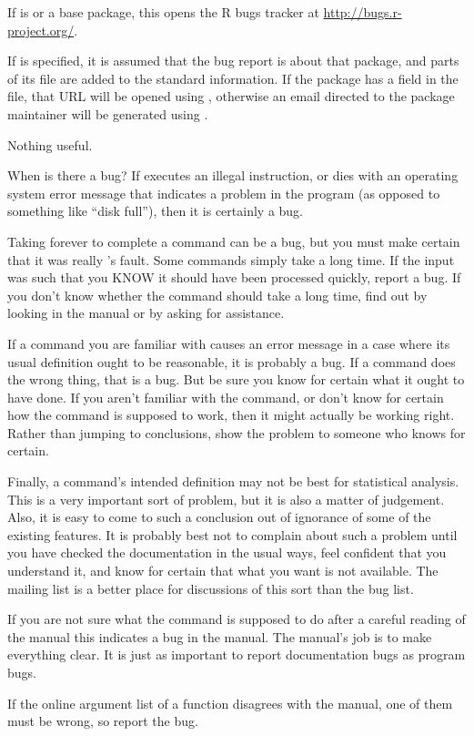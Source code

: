%
\begin{Details}\relax
If  is  or a base package, this opens the R
bugs tracker at \url{http://bugs.r-project.org/}.

If  is specified, it is assumed that the bug report is
about that package, and parts of its  file are
added to the standard information.  If the package has a
 field in the  file, that URL
will be opened using , otherwise an email
directed to the package maintainer will be generated using
.  
\end{Details}
%
\begin{Value}
Nothing useful.
\end{Value}
%
\begin{Section}{When is there a bug?}
If \R{} executes an illegal instruction, or dies with an operating
system error message that indicates a problem in the program (as
opposed to something like ``disk full''), then it is certainly a
bug.

Taking forever to complete a command can be a bug, but you must make
certain that it was really \R{}'s fault.  Some commands simply take a
long time.  If the input was such that you KNOW it should have been
processed quickly, report a bug.  If you don't know whether the
command should take a long time, find out by looking in the manual or
by asking for assistance.

If a command you are familiar with causes an \R{} error message in a
case where its usual definition ought to be reasonable, it is probably
a bug.  If a command does the wrong thing, that is a bug.  But be sure
you know for certain what it ought to have done.  If you aren't
familiar with the command, or don't know for certain how the command
is supposed to work, then it might actually be working right.  Rather
than jumping to conclusions, show the problem to someone who knows for
certain.

Finally, a command's intended definition may not be best for
statistical analysis.  This is a very important sort of problem, but
it is also a matter of judgement.  Also, it is easy to come to such a
conclusion out of ignorance of some of the existing features.  It is
probably best not to complain about such a problem until you have
checked the documentation in the usual ways, feel confident that you
understand it, and know for certain that what you want is not
available. The mailing list  is a better
place for discussions of this sort than the bug list.

If you are not sure what the command is supposed to do
after a careful reading of the manual this indicates a bug in the
manual.  The manual's job is to make everything clear.  It is just as
important to report documentation bugs as program bugs.

If the online argument list of a function disagrees with the manual,
one of them must be wrong, so report the bug.
\end{Section}
